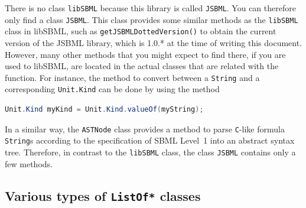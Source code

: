 There is no class \texttt{libSBML} because this library is called
\texttt{JSBML}.
%
You can therefore only find a class \texttt{JSBML}.
%
This class provides some similar methods as the \texttt{libSBML} class in
libSBML, such as \texttt{getJSBMLDottedVersion()}
%
to obtain the current version of the JSBML library, which is 1.0.* at the time of
writing this document. However, many other methods that you might expect
to find there, if you are used to libSBML, are located in the actual classes
that are related with the function. For instance, the method to convert between
a \texttt{String}
%
%
and a corresponding \texttt{Unit.Kind}
%
can be done by using the method
\begin{lstlisting}[language=Java,numbers=none]
Unit.Kind myKind = Unit.Kind.valueOf(myString);
\end{lstlisting}
In a similar way, the \texttt{ASTNode} class provides a method to parse
\texttt{C}-like
formula \texttt{String}s according to the specification of SBML Level~1
\citep{Hucka2003} into an abstract syntax tree. Therefore, in contrast to the
\texttt{libSBML} class, the class \texttt{JSBML}
%
contains only a few methods.


\subsection{Various types of \texttt{ListOf*} classes}


